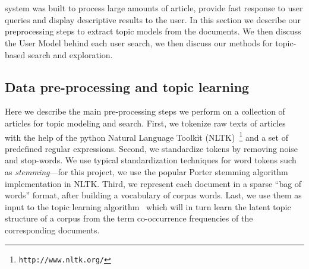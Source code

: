 \section{\system}


{\system} system was built to process large amounts of article,
provide fast response to user queries and display descriptive
results to the user.
In this section we describe our preprocessing steps to extract
topic models from the documents.
We then discuss the User Model behind each user search, we then
discuss our methods for topic-based search and exploration.



\subsection{Data pre-processing and topic learning}

Here we describe the main pre-processing steps we perform on a 
collection of articles for topic modeling and search. First, 
we tokenize raw texts of articles with the help of the python 
Natural Language Toolkit (NLTK)~\footnote{\texttt{http://www.nltk.org/}} and a set of 
predefined regular expressions. Second, we standardize tokens by 
removing noise and stop-words. We use typical standardization 
techniques for word tokens such as \textsl{stemming}---for this 
project, we use the popular Porter stemming algorithm~\cite{Porter1980} 
implementation in NLTK\@. Third, we represent each 
document in a sparse ``bag of words'' format, after building a 
vocabulary of corpus words. Last, we use them as input to the topic 
learning algorithm~\cite{hoffman2010online} which will in turn learn 
the latent topic structure of a corpus from the term co-occurrence 
frequencies of the corresponding documents. %



